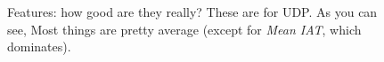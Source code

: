 \documentclass[conference, letterpaper, 10pt, times]{IEEEtran}
\begin{document}
\begin{figure}
\begin{subfigure}{0.32\linewidth}
	\end{subfigure}
	\caption{
		Features: how good are they really? These are for UDP. As you can see, Most things are pretty average (except for \emph{Mean IAT}, which dominates).
	\label{fig:udp-feature-plots}
}
\end{figure}

\end{document}
